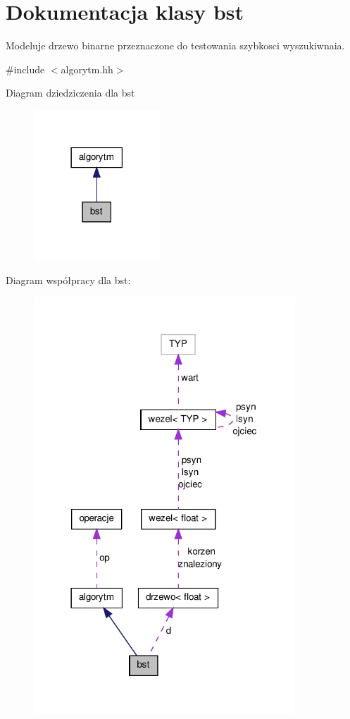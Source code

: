 \hypertarget{classbst}{\section{\-Dokumentacja klasy bst}
\label{classbst}
}


\-Modeluje drzewo binarne przeznaczone do testowania szybkosci wyszukiwnaia.  




{\ttfamily \#include $<$algorytm.\-hh$>$}



\-Diagram dziedziczenia dla bst\nopagebreak
\begin{figure}[H]
\begin{center}
\leavevmode
\includegraphics[width=134pt]{classbst__inherit__graph}
\end{center}
\end{figure}


\-Diagram współpracy dla bst\-:\nopagebreak
\begin{figure}[H]
\begin{center}
\leavevmode
\includegraphics[width=278pt]{classbst__coll__graph}
\end{center}
\end{figure}
